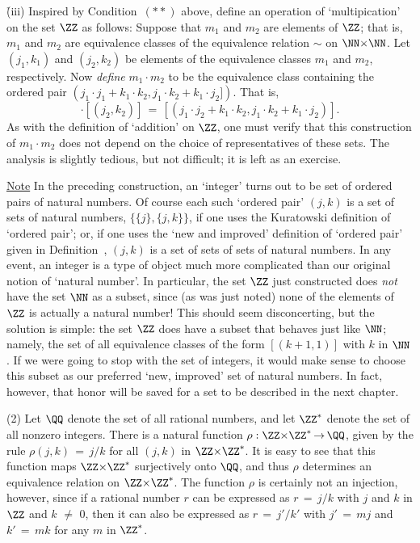 {{        \h (iii) Inspired by Condition~$({\ast}{\ast})$ above, define an operation of `multipication' on the set ${\ZZ}$ as follows:
    Suppose that $m_{1}$ and $m_{2}$ are elements of ${\ZZ}$; that is, $m_{1}$ and $m_{2}$ are equivalence classes of the equivalence relation $\sim$ on ${\NN}{\times}{\NN}$.
    Let $(j_{1},k_{1})$ and $(j_{2},k_{2})$ be elements of the equivalence classes $m_{1}$ and $m_{2}$, respectively.
    Now {\em define} $m_{1}{\cdot}m_{2}$ to be the equivalence class containing the ordered pair $(j_{1}{\cdot}j_{1} + k_{1}{\cdot}k_{2}, j_{1}{\cdot}k_{2}+k_{1}{\cdot}j_{2}])$.
    That is,
        \begin{displaymath}
        [(j_{1},k_{1})] {\cdot} [(j_{2},k_{2})] \,=\, [(j_{1}{\cdot}j_{2} + k_{1}{\cdot}k_{2}, j_{1}{\cdot}k_{2} + k_{1}{\cdot}j_{2})].
        \end{displaymath}
    As with the definition of `addition' on ${\ZZ}$, one must verify that this construction of $m_{1}{\cdot}m_{2}$ does not depend on the choice of representatives of these sets.
    The analysis is slightly tedious, but not difficult; it is left as an exercise.

        \underline{Note} In the preceding construction, an `integer' turns out to be set of ordered pairs of natural numbers.
    Of course each such `ordered pair' $(j,k)$ is a set of sets of natural numbers, $\{\{j\},\{j,k\}\}$, if one uses the Kuratowski definition of `ordered pair';
    or, if one uses the `new and improved' definition of `ordered pair' given in Definition~,
    $(j,k)$ is a set of sets of sets of natural numbers.
    In any event, an integer is a  type of object much more complicated than our original notion of `natural number'.
    In particular, the set ${\ZZ}$ just constructed does {\em not} have the set ${\NN}$ as a subset, since (as was just noted) none of the elements of ${\ZZ}$ is actually a natural number!
    This  should  seem  disconcerting, but the solution is simple:  the set ${\ZZ}$ does have a subset that behaves just like ${\NN}$;
    namely, the set of all equivalence classes of the form $[(k+1,1)]$ with $k$ in ${\NN}$.
    If we were going to stop with the set of integers, it would make sense to choose this subset as our preferred `new, improved' set of natural numbers.
    In fact, however, that honor will be saved for a set to be described in the next chapter.

\V

        (2) Let ${\QQ}$ denote the set of all rational numbers, and let ${\ZZ}^{*}$ denote the set of all nonzero integers.
    There is a natural function ${\rho}:{\ZZ}{\times}{\ZZ}^{*} \,{\rightarrow}\, {\QQ}$,
    given by the rule ${\rho}(j,k) \,=\, j/k$ for all $(j,k)$ in ${\ZZ}{\times}{\ZZ}^{*}$.
    It is easy to see that this function maps ${\ZZ}{\times}{\ZZ}^{*}$ surjectively onto ${\QQ}$,
    and thus ${\rho}$ determines an equivalence relation on ${\ZZ}{\times}{\ZZ}^{*}$.
    The function ${\rho}$ is certainly not an injection, however, since if a rational number $r$ can be expressed as $r \,=\, j/k$ with $j$ and $k$ in ${\ZZ}$ and $k \,\,{\neq}\,\, 0$,
    then it can also be expressed as $r \,=\, j'/k'$ with $j' \,=\, mj$ and $k' \,=\, mk$ for any $m$ in ${\ZZ}^{*}$.

}}
